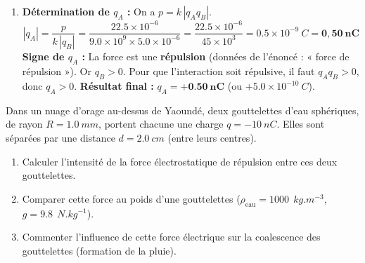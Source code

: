 \documentclass[11pt]{article}
\begin{document}
\begin{exoresolu}
\begin{enumerate}
    \item \textbf{Détermination de $q_A$ :}
    On a $p = k\,|q_A q_B|$.
    \[
    |q_A| = \frac{p}{k\,|q_B|} = \frac{\num{22,5} \times 10^{-6}}{\num{9,0} \times 10^9 \times \num{5,0} \times 10^{-6}} = \frac{\num{22,5} \times 10^{-6}}{\num{45} \times 10^3} = \num{0,5} \times 10^{-9}\ C = \mathbf{0,50\ nC}
    \]
    \textbf{Signe de $q_A$ :} La force est une \textbf{répulsion} (données de l'énoncé : « force de répulsion »). Or $q_B > 0$. Pour que l'interaction soit répulsive, il faut $q_A q_B > 0$, donc $q_A > 0$.
    \textbf{Résultat final :} $q_A = \mathbf{+\num{0,50}\ nC}$ (ou $+\num{5,0} \times 10^{-10}\ C$).
\end{enumerate}
\end{exoresolu}

\begin{exercice}
Dans un nuage d'orage au-dessus de Yaoundé, deux gouttelettes d'eau sphériques, de rayon $R = \num{1,0}\ mm$, portent chacune une charge $q = -\num{10}\ nC$. Elles sont séparées par une distance $d = \num{2,0}\ cm$ (entre leurs centres).
\begin{enumerate}
    \item Calculer l'intensité de la force électrostatique de répulsion entre ces deux gouttelettes.
    \item Comparer cette force au poids d'une gouttelettes ($\rho_{\text{eau}} = \num{1000}\ \SI{}{kg.m^{-3}}$, $g = \num{9,8}\ \SI{}{N.kg^{-1}}$).
    \item Commenter l'influence de cette force électrique sur la coalescence des gouttelettes (formation de la pluie).
\end{enumerate}
\end{exercice}
\end{document}
